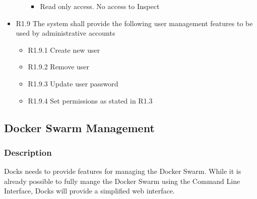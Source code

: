 \documentclass[]{article}
\begin{document}
\begin{itemize}
\begin{itemize}
		            \begin{itemize}
			            \item Read only access. No access to Inspect
		            \end{itemize}
	      \end{itemize}
	\item R1.9 The system shall provide the following user management features to be used by administrative accounts
	      \begin{itemize}
		      \item R1.9.1 Create new user
		      \item R1.9.2 Remove user
		      \item R1.9.3 Update user password
		      \item R1.9.4 Set permissions as stated in R1.3
	      \end{itemize}
\end{itemize}

\subsection{Docker Swarm Management}
\subsubsection{Description}
Docks needs to provide features for managing the Docker Swarm. While it is already possible to fully mange the Docker Swarm using the Command Line Interface, Docks will provide a simplified web interface.
\end{document}
